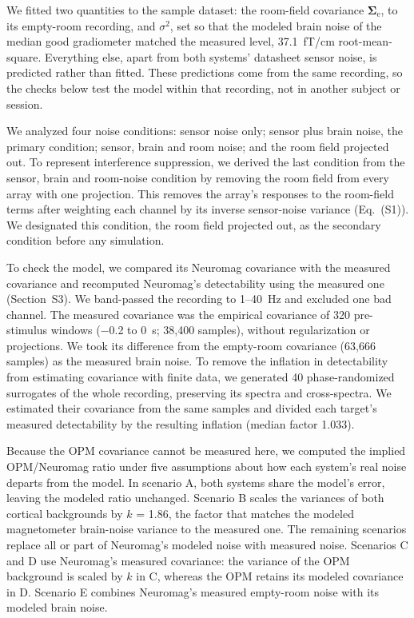 \documentclass[preprint,12pt,authoryear,a4paper]{elsarticle}
\begin{document}
We fitted two quantities to the sample dataset: the room-field covariance $\symbf{\Sigma}_{\mathrm{e}}$, to its empty-room recording, and $\sigma^{2}$, set so that the modeled brain noise of the median good gradiometer matched the measured level, 37.1~fT/cm root-mean-square. Everything else, apart from both systems' datasheet sensor noise, is predicted rather than fitted. These predictions come from the same recording, so the checks below test the model within that recording, not in another subject or session.

We analyzed four noise conditions: sensor noise only; sensor plus brain noise, the primary condition; sensor, brain and room noise; and the room field projected out. To represent interference suppression, we derived the last condition from the sensor, brain and room-noise condition by removing the room field from every array with one projection. This removes the array's responses to the room-field terms after weighting each channel by its inverse sensor-noise variance (Eq.~(S1)). We designated this condition, the room field projected out, as the secondary condition before any simulation.

To check the model, we compared its Neuromag covariance with the measured covariance and recomputed Neuromag's detectability using the measured one (Section~S3). We band-passed the recording to 1–40~Hz and excluded one bad channel. The measured covariance was the empirical covariance of 320 pre-stimulus windows (−0.2 to 0~s; 38,400 samples), without regularization or projections. We took its difference from the empty-room covariance (63,666 samples) as the measured brain noise. To remove the inflation in detectability from estimating covariance with finite data, we generated 40 phase-randomized surrogates of the whole recording, preserving its spectra and cross-spectra. We estimated their covariance from the same samples and divided each target's measured detectability by the resulting inflation (median factor 1.033).

Because the OPM covariance cannot be measured here, we computed the implied OPM/Neuromag ratio under five assumptions about how each system's real noise departs from the model. In scenario A, both systems share the model's error, leaving the modeled ratio unchanged. Scenario B scales the variances of both cortical backgrounds by $k$ = 1.86, the factor that matches the modeled magnetometer brain-noise variance to the measured one. The remaining scenarios replace all or part of Neuromag's modeled noise with measured noise. Scenarios C and D use Neuromag's measured covariance: the variance of the OPM background is scaled by $k$ in C, whereas the OPM retains its modeled covariance in D. Scenario E combines Neuromag's measured empty-room noise with its modeled brain noise.
\end{document}

